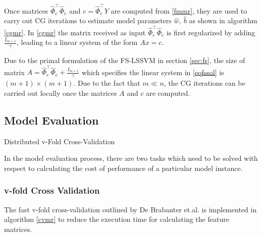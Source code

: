 Once matrices $\hat{\Phi}^{\intercal}_e \hat{\Phi}_e$ and $c = \hat{\Phi}^{\intercal}_e Y$ are computed from \ref{fmmr}, they are used to carry out CG iterations to estimate model parameters $\hat{w},\ \hat{b}$ as shown in algorithm \ref{cgmr}. In \ref{cgmr} the matrix received as input $\hat{\Phi}^{\intercal}_e \hat{\Phi}_e$ is first regularized by adding $\frac{\mathit{I}_{m+1}}{\gamma}$, leading to a linear system of the form $Ax = c$.

Due to the primal formulation of the FS-LSSVM in section \ref{sec:fs}, the size of matrix $A =  \hat{\Phi}^{\intercal}_e \hat{\Phi}_e + \frac{\mathit{I}_{m+1}}{\gamma}$ which specifies the linear system in \eqref{eqfssol} is $(m+1) \times (m+1)$. Due to the fact that $m \ll n$, the CG iterations can be carried out locally once the matrices $A$ and $c$ are computed.

\subsection*{Model Evaluation}

\begin{algorithm}[!ht]\label{cvmr}
    \DontPrintSemicolon
    
\caption{Distributed v-Fold Cross-Validation}
\end{algorithm}

In the model evaluation process, there are two tasks which need to be solved with respect to calculating the cost of performance of a particular model instance.

\subsubsection*{v-fold Cross Validation}
The fast v-fold cross-validation outlined by De Brabanter et.al. \cite{DeBrabanter2010} is implemented in algorithm \ref{cvmr} to reduce the execution time for calculating the feature matrices.


